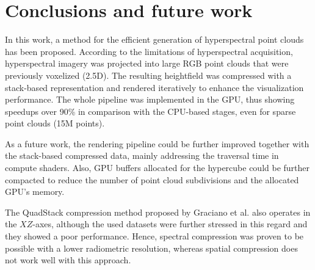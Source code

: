 \section{Conclusions and future work}

In this work, a method for the efficient generation of hyperspectral point clouds has been proposed. According to the limitations of hyperspectral acquisition, hyperspectral imagery was projected into large RGB point clouds that were previously voxelized (2.5D). The resulting heightfield was compressed with a stack-based representation and rendered iteratively to enhance the visualization performance. The whole pipeline was implemented in the GPU, thus showing speedups over 90\% in comparison with the CPU-based stages, even for sparse point clouds (15M points).

As a future work, the rendering pipeline could be further improved together with the stack-based compressed data, mainly addressing the traversal time in compute shaders. Also, GPU buffers allocated for the hypercube could be further compacted to reduce the number of point cloud subdivisions and the allocated GPU's memory. 

\begin{kaobox}[frametitle=QuadStack compression of spatial data in hypercubes]
The QuadStack compression method proposed by Graciano et al. \cite{graciano_quadstack_2021} also operates in the $XZ$-axes, although the used datasets were further stressed in this regard and they showed a poor performance. Hence, spectral compression was proven to be possible with a lower radiometric resolution, whereas spatial compression does not work well with this approach.  
\end{kaobox}